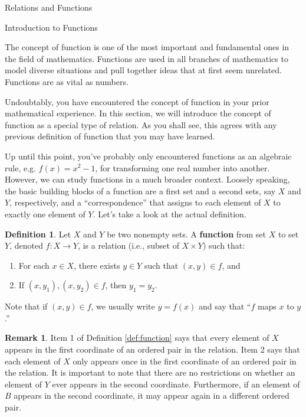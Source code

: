 \documentclass[11pt]{article}
\theoremstyle{definition}
\newtheorem{definition}[theorem]{Definition}
\newtheorem{remark}[theorem]{Remark}
\begin{document}
\addtocounter{section}{4}

\begin{section}{Relations and Functions}

\addtocounter{subsection}{3}
\addtocounter{theorem}{68}

\begin{subsection}{Introduction to Functions}

The concept of function is one of the most important and fundamental ones in the field of mathematics.  Functions are used in all branches of mathematics to model diverse situations and pull together ideas that at first seem unrelated.  Functions are as vital as numbers.

Undoubtably, you have encountered the concept of function in your prior mathematical experience.  In this section, we will introduce the concept of function as a special type of relation.  As you shall see, this agrees with any previous definition of function that you may have learned.  

Up until this point, you've probably only encountered functions as an algebraic rule, e.g. $f(x)=x^{2}-1$, for transforming one real number into another.  However, we can study functions in a much broader context.  Loosely speaking, the basic building blocks of a function are a first set and a second sets, say $X$ and $Y$, respectively, and a ``correspondence'' that assigns to each element of $X$ to exactly one element of $Y$.  Let's take a look at the actual definition.

\begin{definition}
Let $X$ and $Y$ be two nonempty sets.  A \textbf{function} from set $X$ to set $Y$, denoted $f:X\to Y$, is a relation (i.e., subset of $X\times Y$) such that:

\begin{enumerate}\label{def:function}
\item For each $x\in X$, there exists $y\in Y$ such that $(x,y)\in f$, and
\item If $(x,y_{1}), (x,y_{2}) \in f$, then $y_{1}=y_{2}$.
\end{enumerate}
Note that if $(x,y)\in f$, we usually write $y=f(x)$ and say that ``$f$ maps $x$ to $y$.''
\end{definition}

\begin{remark}
Item 1 of Definition \ref{def:function} says that every element of $X$ appears in the first coordinate of an ordered pair in the relation.  Item 2 says that each element of $X$ only appears once in the first coordinate of an ordered pair in the relation.  It is important to note that there are no restrictions on whether an element of $Y$ ever appears in the second coordinate.  Furthermore, if an element of $B$ appears in the second coordinate, it may appear again in a different ordered pair.
\end{remark}


\end{subsection}
\end{section}
\end{document}
